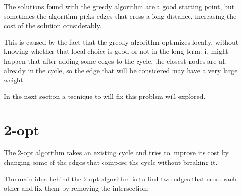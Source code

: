 The solutions found with the greedy algorithm are a good starting point, but sometimes the algorithm picks edges that cross a long distance, increasing the cost of the solution considerably.

This is caused by the fact that the greedy algorithm optimizes locally, without knowing whether that local choice is good or not in the long term: it might happen that after adding some edges to the cycle, the closest nodes are all already in the cycle, so the edge that will be considered may have a very large weight.

In the next section a tecnique to will fix this problem will explored.

\section{2-opt}

The 2-opt algorithm takes an existing cycle and tries to improve its cost by changing some of the edges that compose the cycle without breaking it.

The main idea behind the 2-opt algorithm is to find two edges that cross each other and fix them by removing the intersection:

